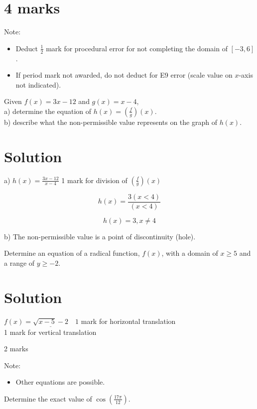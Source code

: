 \documentclass[10pt]{article}
\begin{document}
\section*{4 marks}
Note:

\begin{itemize}
  \item Deduct $\frac{1}{2}$ mark for procedural error for not completing the domain of $[-3,6]$.
  \item If period mark not awarded, do not deduct for E9 error (scale value on $x$-axis not indicated).
\end{itemize}

Given $f(x)=3 x-12$ and $g(x)=x-4$,\\
a) determine the equation of $h(x)=\left(\frac{f}{g}\right)(x)$.\\
b) describe what the non-permissible value represents on the graph of $h(x)$.

\section*{Solution}
a) $h(x)=\frac{3 x-12}{x-4}$ 1 mark for division of $\left(\frac{f}{g}\right)(x)$

$$
h(x)=\frac{3(x<4)}{(x<4)}
$$

$$
h(x)=3, x \neq 4
$$

b) The non-permissible value is a point of discontinuity (hole).

Determine an equation of a radical function, $f(x)$, with a domain of $x \geq 5$ and a range of $y \geq-2$.

\section*{Solution}
$f(x)=\underline{\sqrt{x-5}-2} \quad 1$ mark for horizontal translation\\
1 mark for vertical translation

2 marks

Note:

\begin{itemize}
  \item Other equations are possible.
\end{itemize}

Determine the exact value of $\cos \left(\frac{17 \pi}{12}\right)$.
\end{document}
